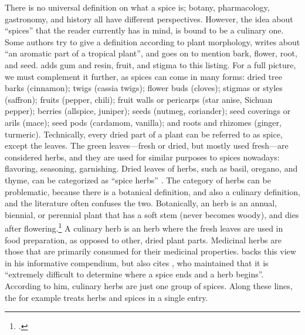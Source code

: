 There is no universal definition on what a spice is; botany, pharmacology, gastronomy, and history all have different perspectives. However, the idea about ``spices'' that the reader currently has in mind, is bound to be a culinary one. Some authors try to give a definition according to plant morphology, \textcite[9]{czarra_spices_2009} writes about ``an aromatic part of a tropical plant'', and goes on to mention bark, flower, root, and seed. \textcite[xix]{turner_spice_2004} adds gum and resin, fruit, and stigma to this listing. For a full picture, we must complement it further, as spices can come in many forms: dried tree barks (cinnamon); twigs
(cassia twigs); flower buds (cloves); stigmas or styles (saffron); fruits (pepper, chili); fruit walls or pericarps (star anise, Sichuan pepper); berries (allspice, juniper); seeds (nutmeg, coriander); seed coverings or arils (mace); seed pods (cardamom, vanilla); and roots and rhizomes (ginger, turmeric). Technically, every dried part of a plant can be referred to as spice, except the leaves. The green leaves---fresh or dried, but mostly used fresh---are considered herbs, and they are used for similar purposes to spices nowadays: flavoring, seasoning, garnishing. Dried leaves of herbs, such as basil, oregano, and thyme, can be categorized as ``spice herbs'' \autocite[see][]{van_wyk_culinary_2014}. The category of herbs can be problematic, because there is a botanical definition, and also a culinary definition, and the literature often confuses the two. Botanically, an herb is an annual, biennial, or perennial plant that has a soft stem (never becomes woody), and dies after flowering.\footcite[herb]{oed} A culinary herb is an herb where the fresh leaves are used in food preparation, as opposed to other, dried plant parts. Medicinal herbs are those that are primarily consumed for their medicinal properties. \textcite[9,16]{oconnell_book_2016} backs this view in his informative compendium, but also cites \textcite[16]{rosengarten_book_1973}, who maintained that it is ``extremely difficult to determine where a spice ends and a herb begins''. According to him, culinary herbs are just one group of spices. Along these lines, the \textcite{britannica_spice_2022} for example treats herbs and spices in a single entry. 

